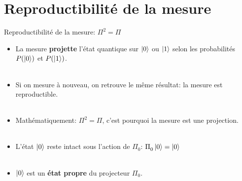 \documentclass[aspectratio=169,12pt]{beamer}
\begin{document}
\section{Reproductibilité de la mesure}

\begin{frame}{Reproductibilité de la mesure: $\Pi^2 = \Pi$}
  \begin{itemize}[<+->]
    \setlength{\itemsep}{0.8em}
    \item La mesure \textbf{projette} l'état quantique sur $\ket{0}$ ou $\ket{1}$
     selon les probabilités $P(\ket 0)$ et $P(\ket 1)$.\\~\\
    \item Si on mesure à nouveau, on retrouve le même résultat: la mesure est reproductible.\\~\\
    \item Mathématiquement: $\Pi^2 = \Pi$, c'est pourquoi la mesure est une projection.\\~\\
    \item L'état $\ket 0$ reste intact sous l'action de $\Pi_0^{}$: $\Pi_0^{} \ket 0 = \ket 0$\\~\\ 
    \item $\ket 0$ est un \textbf{état propre} du projecteur $\Pi_0^{}$.
  \end{itemize}
\end{frame}
\end{document}
